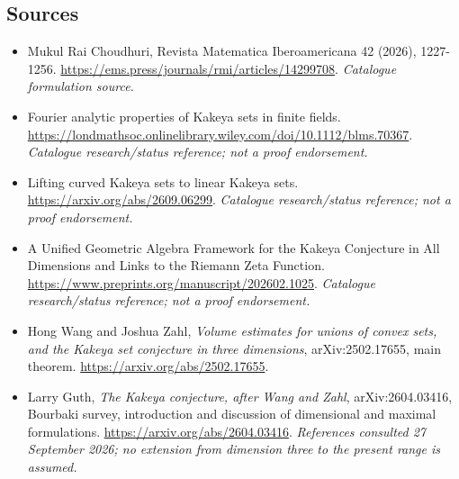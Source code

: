 \documentclass[11pt,a4paper]{article}
\numberwithin{equation}{section}
\begin{document}
\subsection{Sources}
\begin{itemize}\raggedright
\item[\textnormal{[S1]}]\hypertarget{source:statement:1}{} Mukul Rai Choudhuri, Revista Matematica Iberoamericana 42 (2026), 1227-1256.
\url{https://ems.press/journals/rmi/articles/14299708}.
{\small\textit{Catalogue formulation source.}}
\item[\textnormal{[S2]}]\hypertarget{source:statement:2}{} Fourier analytic properties of Kakeya sets in finite fields.
\url{https://londmathsoc.onlinelibrary.wiley.com/doi/10.1112/blms.70367}.
{\small\textit{Catalogue research/status reference; not a proof endorsement.}}
\item[\textnormal{[S3]}]\hypertarget{source:statement:3}{} Lifting curved Kakeya sets to linear Kakeya sets.
\url{https://arxiv.org/abs/2609.06299}.
{\small\textit{Catalogue research/status reference; not a proof endorsement.}}
\item[\textnormal{[S4]}]\hypertarget{source:statement:4}{} A Unified Geometric Algebra Framework for the Kakeya Conjecture in All Dimensions and Links to the Riemann Zeta Function.
\url{https://www.preprints.org/manuscript/202602.1025}.
{\small\textit{Catalogue research/status reference; not a proof endorsement.}}
\item[\textnormal{[E1]}]\hypertarget{extra:statement:1}{} Hong Wang and Joshua Zahl,
\emph{Volume estimates for unions of convex sets, and the Kakeya set conjecture in three dimensions}, arXiv:2502.17655, main theorem.
\url{https://arxiv.org/abs/2502.17655}.
\item[\textnormal{[E2]}]\hypertarget{extra:statement:2}{} Larry Guth,
\emph{The Kakeya conjecture, after Wang and Zahl}, arXiv:2604.03416,
Bourbaki survey, introduction and discussion of dimensional and maximal formulations.
\url{https://arxiv.org/abs/2604.03416}.
{\small\textit{References consulted 27 September 2026; no extension from dimension three to the present range is assumed.}}

\end{itemize}

\end{document}

